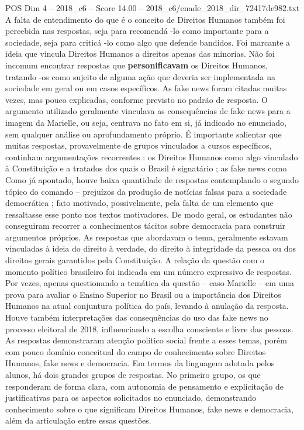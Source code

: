 \begin{textsample}{POS Dim 4 – 2018\_c6 – Score 14.00 – 2018\_c6/enade\_2018\_dir\_72417de982.txt}
A falta de entendimento do que é o conceito de Direitos Humanos também foi percebida nas respostas, seja para recomendá -lo como importante para a sociedade, seja para criticá -lo como algo que defende bandidos.
Foi marcante a ideia que vincula Direitos Humanos a direitos apenas das minorias.
Não foi incomum encontrar respostas que \textbf{personificavam} os Direitos Humanos, tratando -os como sujeito de alguma ação que deveria ser implementada na sociedade em geral ou em casos específicos.
As fake news foram citadas muitas vezes, mas pouco explicadas, conforme previsto no padrão de resposta.
O argumento utilizado geralmente vinculava as consequências de fake news para a imagem da Marielle, ou seja, centrava no fato em si, já indicado no enunciado, sem qualquer análise ou aprofundamento próprio.
É importante salientar que muitas respostas, provavelmente de grupos vinculados a cursos específicos, continham argumentações recorrentes : os Direitos Humanos como algo vinculado à Constituição e a tratados dos quais o Brasil é signatário ; as fake news como Como já apontado, houve baixa quantidade de respostas contemplando o segundo tópico do comando – prejuízos da produção de notícias falsas para a sociedade democrática ; fato motivado, possivelmente, pela falta de um elemento que ressaltasse esse ponto nos textos motivadores.
De modo geral, os estudantes não conseguiram recorrer a conhecimentos tácitos sobre democracia para construir argumentos próprios.
As respostas que abordavam o tema, geralmente estavam vinculadas à ideia do direito à verdade, do direito à integridade da pessoa ou dos direitos gerais garantidos pela Constituição.
A relação da questão com o momento político brasileiro foi indicada em um número expressivo de respostas.
Por vezes, apenas questionando a temática da questão – caso Marielle – em uma prova para avaliar o Ensino Superior no Brasil ou a importância dos Direitos Humanos na atual conjuntura política do país, levando à anulação da resposta.
Houve também interpretações das consequências do uso das fake news no processo eleitoral de 2018, influenciando a escolha consciente e livre das pessoas.
As respostas demonstraram atenção político social frente a esses temas, porém com pouco domínio conceitual do campo de conhecimento sobre Direitos Humanos, fake news e democracia.
Em termos da linguagem adotada pelos alunos, há dois grandes grupos de respostas.
No primeiro grupo, os que responderam de forma clara, com autonomia de pensamento e explicitação de justificativas para os aspectos solicitados no enunciado, demonstrando conhecimento sobre o que significam Direitos Humanos, fake news e democracia, além da articulação entre essas questões.

\end{textsample}
